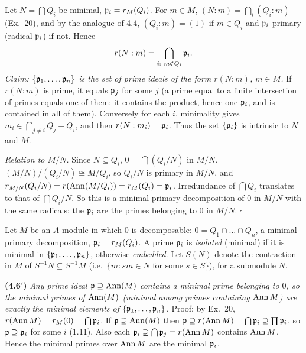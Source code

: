 \documentclass[11pt]{article}
\begin{document}
\pf
Let $N=\bigcap Q_i$ be minimal, $\mathfrak p_i=r_M(Q_i)$. For $m\in M$, $(N:m)=\bigcap_i(Q_i:m)$ (Ex.~20), and by the analogue of 4.4, $(Q_i:m)=(1)$ if $m\in Q_i$ and $\mathfrak p_i$-primary (radical $\mathfrak p_i$) if not. Hence
\[
r(N:m)=\bigcap_{i:\ m\notin Q_i}\mathfrak p_i .
\]
\emph{Claim: $\{\mathfrak p_1,\dots,\mathfrak p_n\}$ is the set of prime ideals of the form $r(N:m)$, $m\in M$.} If $r(N:m)$ is prime, it equals $\mathfrak p_j$ for some $j$ (a prime equal to a finite intersection of primes equals one of them: it contains the product, hence one $\mathfrak p_i$, and is contained in all of them). Conversely for each $i$, minimality gives $m_i\in\bigcap_{j\ne i}Q_j-Q_i$, and then $r(N:m_i)=\mathfrak p_i$. Thus the set $\{\mathfrak p_i\}$ is intrinsic to $N$ and $M$.

\emph{Relation to $M/N$.} Since $N\subseteq Q_i$, $0=\bigcap(Q_i/N)$ in $M/N$. $(M/N)/(Q_i/N)\cong M/Q_i$, so $Q_i/N$ is primary in $M/N$, and $r_{M/N}(Q_i/N)=r(\operatorname{Ann}(M/Q_i))=r_M(Q_i)=\mathfrak p_i$. Irredundance of $\bigcap Q_i$ translates to that of $\bigcap Q_i/N$. So this is a minimal primary decomposition of $0$ in $M/N$ with the same radicals; the $\mathfrak p_i$ are the primes belonging to $0$ in $M/N$. \hfill$\square$

\pf
Let $M$ be an $A$-module in which $0$ is decomposable: $0=Q_1\cap\dots\cap Q_n$, a minimal primary decomposition, $\mathfrak p_i=r_M(Q_i)$. A prime $\mathfrak p_i$ is \emph{isolated} (minimal) if it is minimal in $\{\mathfrak p_1,\dots,\mathfrak p_n\}$, otherwise \emph{embedded}. Let $S(N)$ denote the contraction in $M$ of $S^{-1}N\subseteq S^{-1}M$ (i.e.\ $\{m:sm\in N\text{ for some }s\in S\}$), for a submodule $N$.

\textbf{(4.6$'$)} \emph{Any prime ideal $\mathfrak p\supseteq\operatorname{Ann}(M)$ contains a minimal prime belonging to $0$, so the minimal primes of $\operatorname{Ann}(M)$ (minimal among primes containing $\operatorname{Ann} M$) are exactly the minimal elements of $\{\mathfrak p_1,\dots,\mathfrak p_n\}$.}
Proof: by Ex.~20, $r(\operatorname{Ann} M)=r_M(0)=\bigcap\mathfrak p_i$. If $\mathfrak p\supseteq\operatorname{Ann}(M)$ then $\mathfrak p\supseteq r(\operatorname{Ann} M)=\bigcap\mathfrak p_i\supseteq\prod\mathfrak p_i$, so $\mathfrak p\supseteq\mathfrak p_i$ for some $i$ (1.11). Also each $\mathfrak p_i\supseteq\bigcap\mathfrak p_j=r(\operatorname{Ann} M)$ contains $\operatorname{Ann} M$. Hence the minimal primes over $\operatorname{Ann} M$ are the minimal $\mathfrak p_i$.
\end{document}
